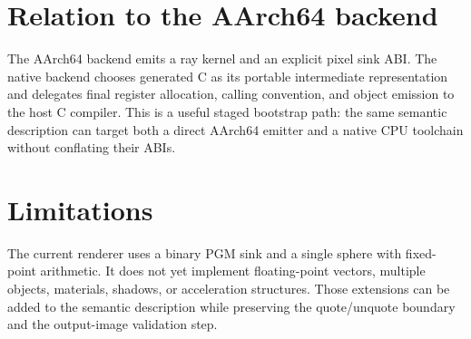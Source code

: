 \documentclass[11pt,a4paper]{article}
\begin{document}
\section{Relation to the AArch64 backend}
The AArch64 backend emits a ray kernel and an explicit pixel sink ABI. The native backend chooses generated C as its portable intermediate representation and delegates final register allocation, calling convention, and object emission to the host C compiler. This is a useful staged bootstrap path: the same semantic description can target both a direct AArch64 emitter and a native CPU toolchain without conflating their ABIs.

\section{Limitations}
The current renderer uses a binary PGM sink and a single sphere with fixed-point arithmetic. It does not yet implement floating-point vectors, multiple objects, materials, shadows, or acceleration structures. Those extensions can be added to the semantic description while preserving the quote/unquote boundary and the output-image validation step.
\end{document}
